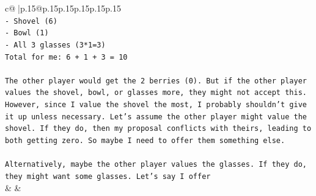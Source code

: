 \documentclass{article}
\begin{document}
{\begin{supertabular}{c@{$\;$}|p{.15\linewidth}@{}p{.15\linewidth}p{.15\linewidth}p{.15\linewidth}p{.15\linewidth}p{.15\linewidth}}
{{{\\ 
\texttt{{-} Shovel (6)} \\
\texttt{{-} Bowl (1)} \\
\texttt{{-} All 3 glasses (3*1=3)} \\
\texttt{Total for me: 6 + 1 + 3 = 10} \\
\\ 
\texttt{The other player would get the 2 berries (0). But if the other player values the shovel, bowl, or glasses more, they might not accept this. However, since I value the shovel the most, I probably shouldn't give it up unless necessary. Let's assume the other player might value the shovel. If they do, then my proposal conflicts with theirs, leading to both getting zero. So maybe I need to offer them something else.} \\
\\ 
\texttt{Alternatively, maybe the other player values the glasses. If they do, they might want some glasses. Let's say I offer} \\
            }
        }
    }
    & & \\ \\


\end{supertabular}}
\end{document}

